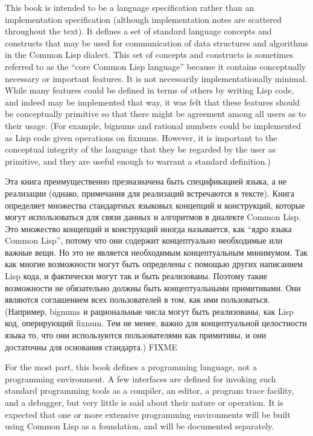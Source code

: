 This book is intended to be a language specification
rather than an implementation specification
(although implementation notes are scattered throughout the text).
It defines a set of
standard language concepts and constructs that may be used
for communication of data structures and algorithms in the Common Lisp
dialect.  This set of concepts
and constructs is sometimes referred to as the ``core Common Lisp language''
because it contains conceptually necessary or important features.
It is not necessarily implementationally minimal.
While many features could be defined in terms of others
by writing Lisp code, and indeed may be implemented that way,
it was felt that these features should be conceptually primitive
so that there might be agreement among all users as to their usage.
(For example, bignums and rational numbers could be implemented as
Lisp code given operations on fixnums.  However, it is important
to the conceptual integrity of the language that they be regarded
by the user as primitive, and they are useful enough to warrant
a standard definition.)

Эта книга преимущественно презназначена быть спецификацией языка, а не
реализации (однако, примечания для реализаций встречаются в тексте).
Книга определяет множества стандартных языковых концепций и конструкций, которые
могут использоваться для связи данных и алгоритмов в диалекте Common Lisp. Это
множество концепций и конструкций иногда называется, как ``ядро языка Common
Lisp'', потому что они содержит концептуально необходимые или важные вещи. Но
это не является необходимым концептуальным минимумом. Так как многие возможности
могут быть определены с помощью других написанием Lisp кода, и фактически могут
так и быть реализованы. Поэтому такие возможности не обязательно должны быть
концептуальными примитивами. Они являются соглашением всех пользователей в том,
как ими пользоваться. (Например, bignums и рациональные числа могут быть
реализованы, как Lisp код, оперирующий fixnum. Тем не менее, важно для
концептуальной целостности языка то, что они используются пользователями как
примитивы, и они достаточны для основания стандарта.) FIXME


For the most part, this book defines a programming language, not a
programming environment.  A few interfaces are defined for
invoking such standard programming tools as a compiler, an editor,
a program trace facility, and a debugger, but very little is said
about their nature or operation.  It is expected that one or more
extensive programming environments will be built using Common Lisp as a
foundation, and will be documented separately.

